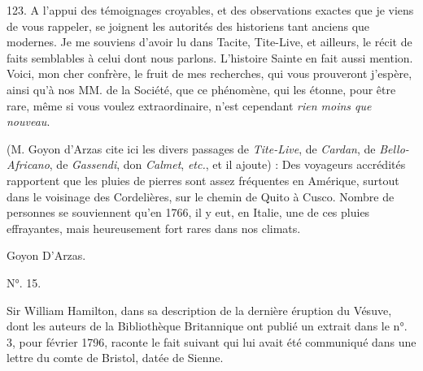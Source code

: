 \documentclass[a4paper, 11pt, oneside, polutonikogreek, french]{article}
\begin{document}
123. A l'appui des témoignages croyables, et des observations exactes que je viens de vous rappeler, se joignent les autorités des historiens tant anciens que modernes. Je me souviens d'avoir lu dans Tacite, Tite-Live, et ailleurs, le récit de faits semblables à celui dont nous parlons. L'histoire Sainte en fait aussi mention. Voici, mon cher confrère, le fruit de mes recherches, qui vous prouveront j'espère, ainsi qu'à nos MM. de la Société, que ce phénomène, qui les étonne, pour être rare, même si vous voulez extraordinaire, n'est cependant \emph{rien moins que nouveau}.

(M. Goyon d'Arzas cite ici les divers passages de \emph{Tite-Live}, de \emph{Cardan}, de \emph{Bello-Africano}, de \emph{Gassendi}, don \emph{Calmet}, \emph{etc.}, et il ajoute) : Des voyageurs accrédités rapportent que les pluies de pierres sont assez fréquentes en Amérique, surtout dans le voisinage des Cordelières, sur le chemin de Quito à Cusco. Nombre de personnes se souviennent qu'en 1766, il y eut, en Italie, une de ces pluies effrayantes, mais heureusement fort rares dans nos climats.

Goyon D'Arzas.

\begin{center}
N°. 15.
\end{center}

Sir William Hamilton, dans sa description de la dernière éruption du Vésuve, dont les auteurs de la Bibliothèque Britannique ont publié un extrait dans le n°. 3, pour février 1796, raconte le fait suivant qui lui avait été communiqué dans une lettre du comte de Bristol, datée de Sienne.
\end{document}
